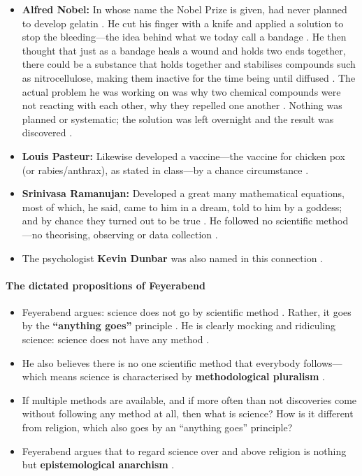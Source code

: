 \begin{ExampleBox}
\begin{itemize}
    \item \textbf{Alfred Nobel:} In whose name the Nobel Prize is given, had never planned to develop gelatin . He cut his finger with a knife and applied a solution to stop the bleeding---the idea behind what we today call a bandage . He then thought that just as a bandage heals a wound and holds two ends together, there could be a substance that holds together and stabilises compounds such as nitrocellulose, making them inactive for the time being until diffused . The actual problem he was working on was why two chemical compounds were not reacting with each other, why they repelled one another . Nothing was planned or systematic; the solution was left overnight and the result was discovered .
    \item \textbf{Louis Pasteur:} Likewise developed a vaccine---the vaccine for chicken pox (or rabies/anthrax), as stated in class---by a chance circumstance .
    \item \textbf{Srinivasa Ramanujan:} Developed a great many mathematical equations, most of which, he said, came to him in a dream, told to him by a goddess; and by chance they turned out to be true . He followed no scientific method---no theorising, observing or data collection .
    \item The psychologist \textbf{Kevin Dunbar} was also named in this connection .
\end{itemize}
\end{ExampleBox}

\paragraph{The dictated propositions of Feyerabend}
\begin{itemize}
    \item Feyerabend argues: science does not go by scientific method . Rather, it goes by the \textbf{``anything goes''} principle . He is clearly mocking and ridiculing science: science does not have any method .
    \item He also believes there is no one scientific method that everybody follows---which means science is characterised by \textbf{methodological pluralism} .
    \item If multiple methods are available, and if more often than not discoveries come without following any method at all, then what is science? How is it different from religion, which also goes by an ``anything goes'' principle? 
    \item Feyerabend argues that to regard science over and above religion is nothing but \textbf{epistemological anarchism} .
\end{itemize}

